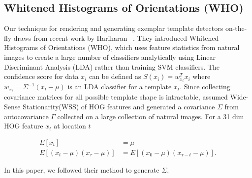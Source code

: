 \subsection{Whitened Histograms of Orientations (WHO)}
\label{sec:who}
Our technique for rendering and generating exemplar template detectors
on-the-fly draws from recent work by Hariharan \etal~\cite{Hariharan12}. They introduced Whitened
Histograms of Orientations (WHO), which uses feature statistics from natural
images to create a large number of classifiers analytically using Linear
Discriminant Analysis (LDA) rather than training SVM
classifiers. The confidence score for data $x_i$ can be
defined as $ S(x_i) = w_{x_t}^T x_i$ where $w_{x_t} = \Sigma^{-1} (x_t - \mu)$
is an LDA classifier for a template $x_t$. Since collecting covariance matrices
for all possible template shape is intractable, \cite{Hariharan12} assumed
Wide-Sense Stationarity(WSS) of HOG features and generated a covariance
$\Sigma$ from autocovariance $\Gamma$ collected on a large collection of
natural images. For a 31 dim HOG feature $x_t$ at location $t$

\begin{align}
    E[x_t] & = \mu\\
    E[(x_{t} - \mu ) (x_{\tau} - \mu)] & = E[(x_0 - \mu)(x_{\tau - t} - \mu)].
\end{align}

In this paper, we followed their method to generate $\Sigma$.




% 
% 


